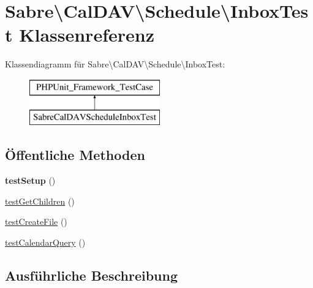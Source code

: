\hypertarget{class_sabre_1_1_cal_d_a_v_1_1_schedule_1_1_inbox_test}{}\section{Sabre\textbackslash{}Cal\+D\+AV\textbackslash{}Schedule\textbackslash{}Inbox\+Test Klassenreferenz}
\label{class_sabre_1_1_cal_d_a_v_1_1_schedule_1_1_inbox_test}
Klassendiagramm für Sabre\textbackslash{}Cal\+D\+AV\textbackslash{}Schedule\textbackslash{}Inbox\+Test\+:\begin{figure}[H]
\begin{center}
\leavevmode
\includegraphics[height=2.000000cm]{class_sabre_1_1_cal_d_a_v_1_1_schedule_1_1_inbox_test}
\end{center}
\end{figure}
\subsection*{Öffentliche Methoden}
\begin{DoxyCompactItemize}
\item 
\mbox{\label{class_sabre_1_1_cal_d_a_v_1_1_schedule_1_1_inbox_test_a68f0792b38714d3992ebed867334942b}} 
{\bfseries test\+Setup} ()
\item 
\mbox{\hyperlink{class_sabre_1_1_cal_d_a_v_1_1_schedule_1_1_inbox_test_a3194d36cb3d9376a31d69a22ac730663}{test\+Get\+Children}} ()
\item 
\mbox{\hyperlink{class_sabre_1_1_cal_d_a_v_1_1_schedule_1_1_inbox_test_ac0c8e619fef5a3177fc345a16ef9288f}{test\+Create\+File}} ()
\item 
\mbox{\hyperlink{class_sabre_1_1_cal_d_a_v_1_1_schedule_1_1_inbox_test_afaebfee6f65738f16da6d4c46cb4df64}{test\+Calendar\+Query}} ()
\end{DoxyCompactItemize}


\subsection{Ausführliche Beschreibung}


